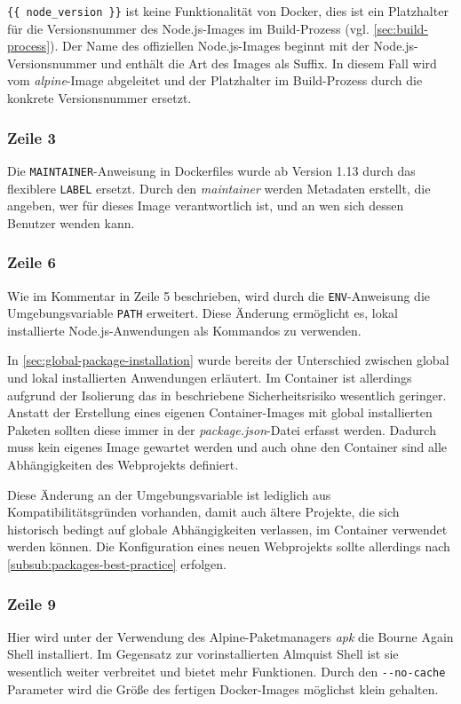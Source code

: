 \verb|{{ node_version }}| ist keine Funktionalität von Docker, dies ist ein Platzhalter für die Versionsnummer des Node.js-Images im Build-Prozess (vgl. \cref{sec:build-process}).
Der Name des offiziellen Node.js-Images beginnt mit der Node.js-Versionsnummer und enthält die Art des Images als Suffix.
In diesem Fall wird vom \emph{alpine}-Image abgeleitet und der Platzhalter im Build-Prozess durch die konkrete Versionsnummer ersetzt.

\subsubsection{Zeile 3}
Die \verb|MAINTAINER|-Anweisung in Dockerfiles wurde ab Version 1.13 durch das flexiblere \verb|LABEL| ersetzt.
Durch den \emph{maintainer} werden Metadaten erstellt, die angeben, wer für dieses Image verantwortlich ist, und an wen sich dessen Benutzer wenden kann.

\subsubsection{Zeile 6}
Wie im Kommentar in Zeile 5 beschrieben, wird durch die \verb|ENV|-Anweisung die Umgebungsvariable \verb|PATH| erweitert.
Diese Änderung ermöglicht es, lokal installierte Node.js-Anwendungen als Kommandos zu verwenden.

In \cref{sec:global-package-installation} wurde bereits der Unterschied zwischen global und lokal installierten Anwendungen erläutert.
Im Container ist allerdings aufgrund der Isolierung das in \autocite{stackoverflow:nodemodules-hack:online} beschriebene Sicherheitsrisiko wesentlich geringer.
Anstatt der Erstellung eines eigenen Container-Images mit global installierten Paketen sollten diese immer in der \emph{package.json}-Datei erfasst werden.
Dadurch muss kein eigenes Image gewartet werden und auch ohne den Container sind alle Abhängigkeiten des Webprojekts definiert.

Diese Änderung an der Umgebungsvariable ist lediglich aus Kompatibilitätsgründen vorhanden, damit auch ältere Projekte, die sich historisch bedingt auf globale Abhängigkeiten verlassen, im Container verwendet werden können.
Die Konfiguration eines neuen Webprojekts sollte allerdings nach \cref{subsub:packages-best-practice} erfolgen.

\subsubsection{Zeile 9}
Hier wird unter der Verwendung des Alpine-Paketmanagers \emph{apk} die Bourne Again Shell installiert.
Im Gegensatz zur vorinstallierten Almquist Shell ist sie wesentlich weiter verbreitet und bietet mehr Funktionen.
Durch den \verb|--no-cache| Parameter wird die Größe des fertigen Docker-Images möglichst klein gehalten.

